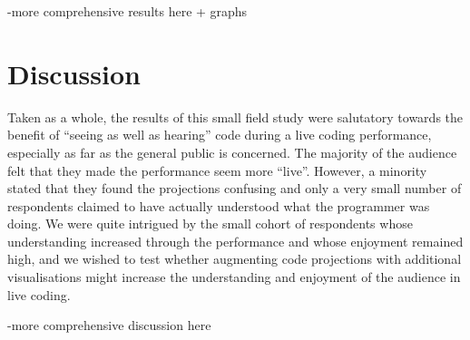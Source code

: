 -more comprehensive results here + graphs




\section{Discussion}

Taken as a whole, the results of this small field study were
salutatory towards the benefit of ``seeing as well as hearing'' code
during a live coding performance, especially as far as the general
public is concerned. The majority of the audience felt that they made
the performance seem more ``live''. However, a minority stated that
they found the projections confusing and only a very small number of
respondents claimed to have actually understood what the programmer
was doing. We were quite intrigued by the small cohort of respondents
whose understanding increased through the performance and whose
enjoyment remained high, and we wished to test whether augmenting code
projections with additional visualisations might increase the
understanding and enjoyment of the audience in live coding.

-more comprehensive discussion here
